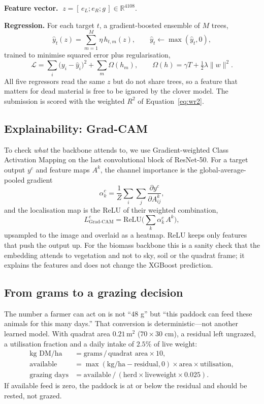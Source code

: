 \documentclass[11pt,a4paper]{article}
\newcommand{\R}{\mathbb{R}}
\begin{document}
\textbf{Feature vector.} $\;z=[\,e_L;e_R;g\,]\in\R^{4108}.$

\textbf{Regression.} For each target $t$, a gradient-boosted ensemble of $M$ trees,
\begin{equation}
\hat{y}_t(z)=\sum_{m=1}^{M}\eta\,h_{t,m}(z),\qquad \hat{y}_t\leftarrow\max(\hat{y}_t,0),
\end{equation}
trained to minimise squared error plus regularisation,
\begin{equation}
\mathcal{L}=\sum_i\big(y_i-\hat{y}_i\big)^2+\sum_m\Omega(h_m),\qquad
\Omega(h)=\gamma T+\tfrac12\lambda\lVert w\rVert^2 .
\end{equation}
All five regressors read the same $z$ but do not share trees, so a feature that matters for dead
material is free to be ignored by the clover model. The submission is scored with the weighted
$R^2$ of Equation~\eqref{eq:wr2}.

\subsection{Explainability: Grad-CAM}\label{sec:gradcam}
To check \emph{what} the backbone attends to, we use Gradient-weighted Class Activation Mapping on
the last convolutional block of ResNet-50. For a target output $y^c$ and feature maps $A^k$, the
channel importance is the global-average-pooled gradient
\begin{equation}
\alpha_k^{c}=\frac{1}{Z}\sum_i\sum_j \frac{\partial y^{c}}{\partial A_{ij}^{k}},
\end{equation}
and the localisation map is the ReLU of their weighted combination,
\begin{equation}
L^{c}_{\text{Grad-CAM}}=\mathrm{ReLU}\!\Big(\sum_k \alpha_k^{c}\,A^{k}\Big),
\end{equation}
upsampled to the image and overlaid as a heatmap. ReLU keeps only features that push the output
up. For the biomass backbone this is a sanity check that the embedding attends to vegetation and
not to sky, soil or the quadrat frame; it explains the features and does not change the XGBoost
prediction.

\subsection{From grams to a grazing decision}
The number a farmer can act on is not ``$48$ g'' but ``this paddock can feed these animals for this
many days.'' That conversion is deterministic---not another learned model. With quadrat area
$0.21\,\mathrm{m}^2$ ($70\times30$ cm), a residual left ungrazed, a utilisation fraction and a
daily intake of $2.5\%$ of live weight:
\begin{align}
\text{kg DM/ha} &= \text{grams}\,/\,\text{quadrat area}\times 10,\\
\text{available} &= \max(\text{kg/ha}-\text{residual},0)\times\text{area}\times\text{utilisation},\\
\text{grazing days} &= \text{available}\,/\,(\text{herd}\times\text{liveweight}\times 0.025).
\end{align}
If available feed is zero, the paddock is at or below the residual and should be rested, not grazed.
\end{document}
